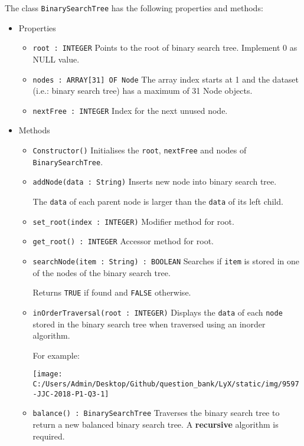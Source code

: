 The class \texttt{BinarySearchTree} has the following properties and
methods: 
\begin{itemize}
\item Properties 
\begin{itemize}
\item \texttt{root : INTEGER} Points to the root of binary search tree.
Implement 0 as NULL value. 
\item \texttt{nodes : ARRAY{[}31{]} OF Node} The array index starts at 1
and the dataset (i.e.: binary search tree) has a maximum of 31 Node
objects. 
\item \texttt{nextFree : INTEGER} Index for the next unused node. 
\end{itemize}
\item Methods 
\begin{itemize}
\item \texttt{Constructor()} Initialises the \texttt{root}, \texttt{nextFree}
and nodes of \texttt{BinarySearchTree}. 
\item \texttt{addNode(data : String)} Inserts new node into binary search
tree. 

The \texttt{data} of each parent node is larger than the \texttt{data}
of its left child. 
\item \texttt{set\_root(index : INTEGER)} Modifier method for root. 
\item \texttt{get\_root() : INTEGER} Accessor method for root. 
\item \texttt{searchNode(item : String) : BOOLEAN} Searches if \texttt{item}
is stored in one of the nodes of the binary search tree. 

Returns \texttt{TRUE} if found and \texttt{FALSE} otherwise. 
\item \texttt{inOrderTraversal(root : INTEGER)} Displays the \texttt{data}
of each \texttt{node} stored in the binary search tree when traversed
using an inorder algorithm. 

For example: 
\begin{center}
\texttt{[image: C:/Users/Admin/Desktop/Github/question\_bank/LyX/static/img/9597-JJC-2018-P1-Q3-1]}
\par\end{center}
\item \texttt{balance() : BinarySearchTree} Traverses the binary search
tree to return a new balanced binary search tree. A \textbf{recursive}
algorithm is required. 
\end{itemize}
\end{itemize}

